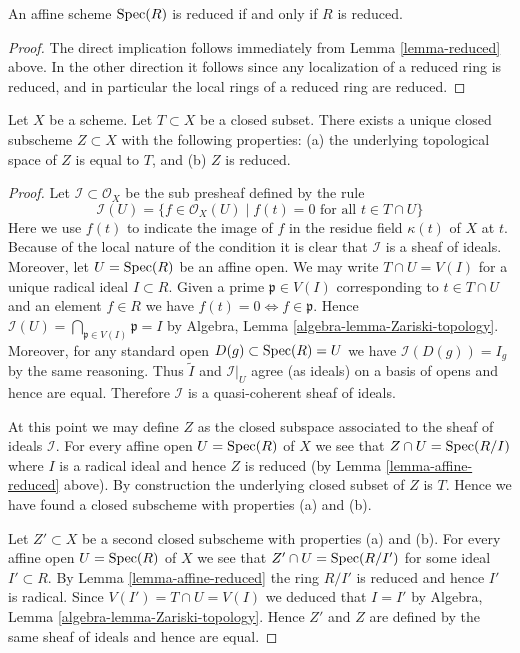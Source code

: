 \begin{lemma}
\label{lemma-affine-reduced}
An affine scheme $\mathop{\mathrm{Spec}}(R)$ is reduced
if and only if $R$ is reduced.
\end{lemma}

\begin{proof}
The direct implication follows immediately from
Lemma \ref{lemma-reduced} above.
In the other direction it follows since any localization of
a reduced ring is reduced, and in particular the local rings
of a reduced ring are reduced.
\end{proof}

\begin{lemma}
\label{lemma-reduced-closed-subscheme}
Let $X$ be a scheme. Let $T \subset X$ be a closed subset.
There exists a unique closed subscheme $Z \subset X$ with
the following properties: (a) the underlying topological
space of $Z$ is equal to $T$, and (b) $Z$ is reduced.
\end{lemma}

\begin{proof}
Let $\mathcal{I} \subset \mathcal{O}_X$ be the sub presheaf
defined by the rule
$$
\mathcal{I}(U) = \{f \in \mathcal{O}_X(U) \mid
f(t) = 0\text{ for all }t \in T\cap U\}
$$
Here we use $f(t)$ to indicate the image of
$f$ in the residue field $\kappa(t)$ of $X$ at $t$.
Because of the local nature of the condition it is
clear that $\mathcal{I}$ is a sheaf of ideals. Moreover,
let $U = \mathop{\mathrm{Spec}}(R)$ be an affine open.
We may write $T \cap U = V(I)$ for a unique radical
ideal $I \subset R$. Given a prime $\mathfrak p \in V(I)$
corresponding to $t \in T \cap U$ and an element $f \in R$ we have
$f(t) = 0 \Leftrightarrow f \in \mathfrak p$.
Hence $\mathcal{I}(U) = \bigcap_{\mathfrak p \in V(I)} \mathfrak p
= I$ by Algebra, Lemma \ref{algebra-lemma-Zariski-topology}.
Moreover, for any standard open $D(g) \subset \mathop{\mathrm{Spec}}(R) = U$
we have $\mathcal{I}(D(g)) = I_g$ by the same reasoning.
Thus $\widetilde I$ and $\mathcal{I}|_U$ agree (as ideals)
on a basis of opens and hence are equal. Therefore
$\mathcal{I}$ is a quasi-coherent sheaf of ideals.

\medskip\noindent
At this point we may define $Z$ as the closed subspace
associated to the sheaf of ideals $\mathcal{I}$. For every
affine open $U = \mathop{\mathrm{Spec}}(R)$ of $X$ we see that
$Z \cap U = \mathop{\mathrm{Spec}}(R/I)$ where $I$ is a radical ideal and
hence $Z$ is reduced (by Lemma \ref{lemma-affine-reduced} above).
By construction the underlying closed subset of $Z$ is $T$.
Hence we have found a closed subscheme with properties (a) and (b).

\medskip\noindent
Let $Z' \subset X$ be a second closed subscheme with properties (a) and (b).
For every affine open $U = \mathop{\mathrm{Spec}}(R)$ of $X$ we see that
$Z' \cap U = \mathop{\mathrm{Spec}}(R/I')$ for some ideal $I' \subset R$.
By Lemma \ref{lemma-affine-reduced} the ring $R/I'$ is
reduced and hence $I'$ is radical. Since $V(I') = T \cap U = V(I)$
we deduced that $I = I'$ by
Algebra, Lemma \ref{algebra-lemma-Zariski-topology}.
Hence $Z'$ and $Z$ are defined by the same sheaf of ideals
and hence are equal.
\end{proof}

